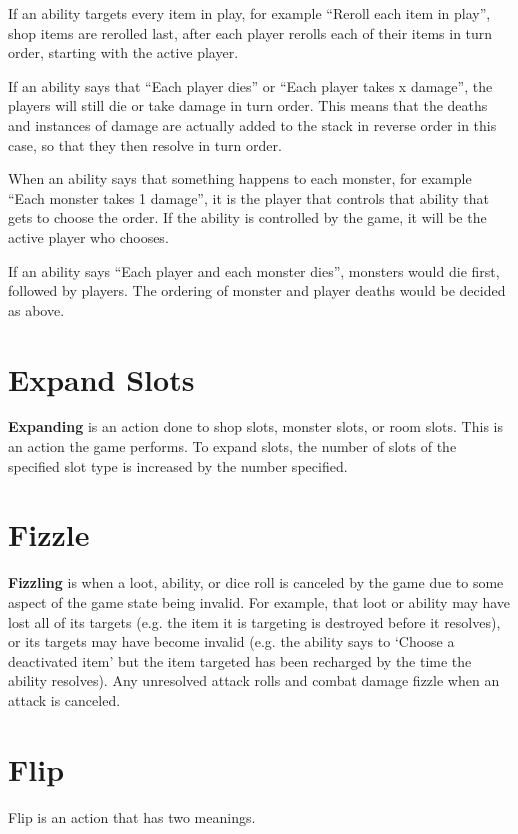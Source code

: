 \documentclass[a4paper, twoside]{report} %
\begin{document}
    If an ability targets every item in play, for example “Reroll each item in play”, shop items are rerolled last, after each player rerolls each of their items in turn order, starting with the active player.

    If an ability says that “Each player dies” or “Each player takes x damage”, the players will still die or take damage in turn order. This means that the deaths and instances of damage are actually added to the stack in reverse order in this case, so that they then resolve in turn order.

    When an ability says that something happens to each monster, for example “Each monster takes 1 damage”, it is the player that controls that ability that gets to choose the order. If the ability is controlled by the game, it will be the active player who chooses.

    If an ability says “Each player and each monster dies”, monsters would die first, followed by players. The ordering of monster and player deaths would be decided as above.
    \section{Expand Slots}
    \textbf{Expanding} is an action done to shop slots, monster slots, or room slots. This is an action the game performs. To expand slots, the number of slots of the specified slot type is increased by the number specified.
    \section{Fizzle}
    \textbf{Fizzling} is when a loot, ability, or dice roll is canceled by the game due to some aspect of the game state being invalid. For example, that loot or ability may have lost all of its targets (e.g. the item it is targeting is destroyed before it resolves), or its targets may have become invalid (e.g. the ability says to ‘Choose a deactivated item’ but the item targeted has been recharged by the time the ability resolves). Any unresolved attack rolls and combat damage fizzle when an attack is canceled.
    \section{Flip}
    Flip is an action that has two meanings.
\end{document}
